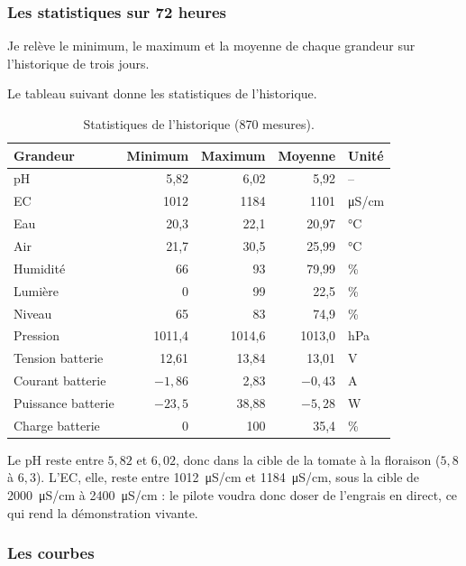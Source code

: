 \subsubsection*{Les statistiques sur 72 heures}

Je relève le minimum, le maximum et la moyenne de chaque grandeur sur l'historique de trois jours.

Le tableau suivant donne les statistiques de l'historique.

\begin{table}[H]
\centering
\small
\begin{tabularx}{\textwidth}{|l|r|r|r|l|}
\hline
\textbf{Grandeur} & \textbf{Minimum} & \textbf{Maximum} & \textbf{Moyenne} & \textbf{Unité} \\
\hline
pH & 5,82 & 6,02 & 5,92 & -- \\
\hline
EC & 1012 & 1184 & 1101 & \unit{\micro S/cm} \\
\hline
Eau & 20,3 & 22,1 & 20,97 & \unit{\celsius} \\
\hline
Air & 21,7 & 30,5 & 25,99 & \unit{\celsius} \\
\hline
Humidité & 66 & 93 & 79,99 & \unit{\percent} \\
\hline
Lumière & 0 & 99 & 22,5 & \unit{\percent} \\
\hline
Niveau & 65 & 83 & 74,9 & \unit{\percent} \\
\hline
Pression & 1011,4 & 1014,6 & 1013,0 & \unit{hPa} \\
\hline
Tension batterie & 12,61 & 13,84 & 13,01 & \unit{V} \\
\hline
Courant batterie & $-1{,}86$ & 2,83 & $-0{,}43$ & \unit{A} \\
\hline
Puissance batterie & $-23{,}5$ & 38,88 & $-5{,}28$ & \unit{W} \\
\hline
Charge batterie & 0 & 100 & 35,4 & \unit{\percent} \\
\hline
\end{tabularx}
\caption{Statistiques de l'historique (870 mesures).}
\end{table}

Le pH reste entre $5{,}82$ et $6{,}02$, donc dans la cible de la tomate à la floraison ($5{,}8$ à $6{,}3$). L'EC, elle, reste entre \qty{1012}{\micro S/cm} et \qty{1184}{\micro S/cm}, sous la cible de \qty{2000}{\micro S/cm} à \qty{2400}{\micro S/cm} : le pilote voudra donc doser de l'engrais en direct, ce qui rend la démonstration vivante.

\subsubsection*{Les courbes}

